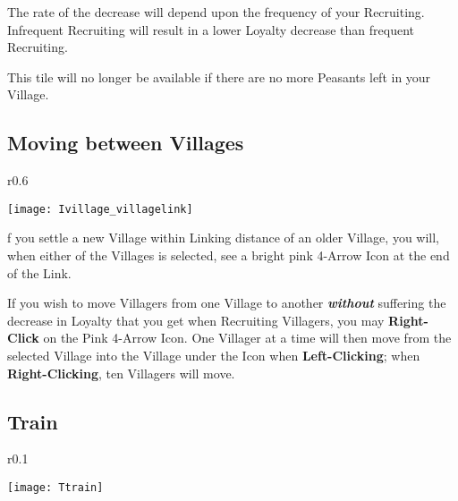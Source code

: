 The rate of the decrease will depend upon the frequency of your Recruiting. Infrequent Recruiting will result in a lower Loyalty decrease than frequent Recruiting.

This tile will no longer be available if there are no more Peasants left in your Village.

\subsection{\textsf{Moving between Villages}}


\begin{wrapfigure}{r}{0.6\textwidth}
    \vspace{-20pt}
    \begin{center}
        \texttt{[image: Ivillage\_villagelink]} %
    \end{center}
    \vspace{-20pt}
\end{wrapfigure}


f you settle a new Village within Linking distance of an older Village, you will, when either of the Villages is selected, see a bright pink 4-Arrow Icon at the end of the Link.


If you wish to move Villagers from one Village to another \textbf{\textit{without}} suffering the decrease in Loyalty that you get when Recruiting Villagers, you may \textbf{Right-Click} on the Pink 4-Arrow Icon. One Villager at a time will then move from the selected Village into the Village under the Icon when \textbf{Left-Clicking}; when \textbf{Right-Clicking}, ten Villagers will move.

\subsection{Train}


\begin{wrapfigure}{r}{0.1\textwidth}
    \vspace{-20pt}
    \begin{center}
        \texttt{[image: Ttrain]}
    \end{center}
    \vspace{-20pt}
\end{wrapfigure}

